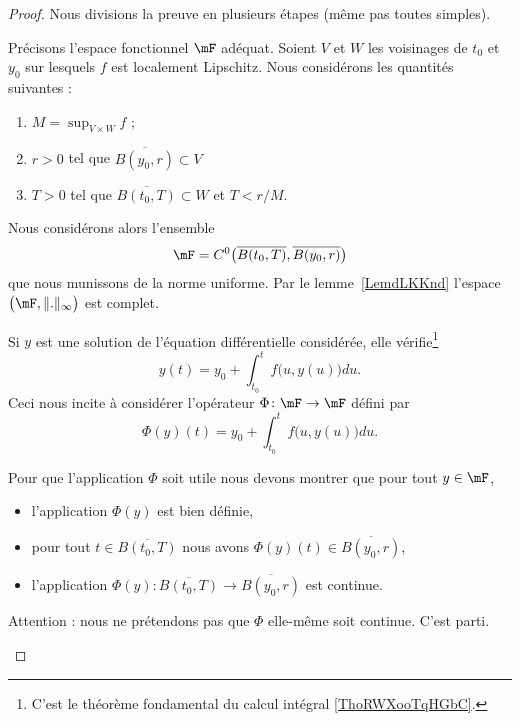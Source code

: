 \begin{proof}
	Nous divisions la preuve en plusieurs étapes (même pas toutes simples).
	\begin{subproof}

		Précisons l'espace fonctionnel \( \mF\) adéquat. Soient \( V\) et \( W\) les voisinages de \( t_0\) et \( y_0\) sur lesquels \( f\) est localement Lipschitz. Nous considérons les quantités suivantes :
		\begin{enumerate}
			\item
			      \( M=\sup_{V\times W}f\) ;
			\item
			      \( r>0\) tel que \( \overline{ B(y_0,r) }\subset V\)
			\item
			      \( T>0\) tel que \( \overline{ B(t_0,T) }\subset W\) et \( T<r/M\).
		\end{enumerate}
		Nous considérons alors l'ensemble
		\begin{equation}
			\mF=C^0\big( \overline{ B(t_0,T) },\overline{ B(y_0,r) } \big)
		\end{equation}
		que nous munissons de la norme uniforme. Par le lemme~\ref{LemdLKKnd} l'espace \( \big( \mF,\| . \|_{\infty} \big)\) est complet.



		Si \( y\) est une solution de l'équation différentielle considérée, elle vérifie\footnote{C'est le théorème fondamental du calcul intégral \ref{ThoRWXooTqHGbC}.}
		\begin{equation}        \label{EqPGLwcL}
			y(t)=y_0+\int_{t_0}^tf\big( u,y(u) \big)du.
		\end{equation}
		Ceci nous incite à considérer l'opérateur \( \Phi\colon \mF\to \mF\) défini par
		\begin{equation}
			\Phi(y)(t)=y_0+\int_{t_0}^tf\big( u,y(u) \big)du.
		\end{equation}

		Pour que l'application \( \Phi\) soit utile nous devons montrer que pour tout \( y\in \mF\),
		\begin{itemize}
			\item l'application \( \Phi(y)\) est bien définie,
			\item pour tout \( t\in\overline{ B(t_0,T) }\) nous avons \( \Phi(y)(t)\in\overline{ B(y_0,r) }\),
			\item l'application \( \Phi(y)\colon  \overline{ B(t_0,T) } \to \overline{ B(y_0,r)}\) est continue.
		\end{itemize}
		Attention : nous ne prétendons pas que \( \Phi\) elle-même soit continue. C'est parti.
		\begin{subproof}


\end{subproof}
\end{subproof}
\end{proof}
